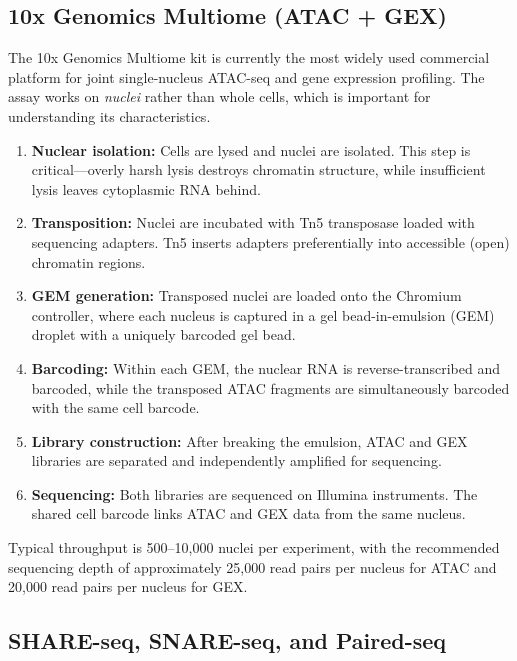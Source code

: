 \subsection{10x Genomics Multiome (ATAC + GEX)}
\label{subsec:multiomics:10x-multiome}

The 10x Genomics Multiome kit is currently the most widely used commercial platform for joint single-nucleus ATAC-seq and gene expression profiling. The assay works on \textit{nuclei} rather than whole cells, which is important for understanding its characteristics.

\begin{protocolbox}[title={10x Multiome ATAC + GEX Protocol Overview}]
\begin{enumerate}[itemsep=2pt]
  \item \textbf{Nuclear isolation:} Cells are lysed and nuclei are isolated. This step is critical---overly harsh lysis destroys chromatin structure, while insufficient lysis leaves cytoplasmic RNA behind.
  \item \textbf{Transposition:} Nuclei are incubated with Tn5 transposase loaded with sequencing adapters. Tn5 inserts adapters preferentially into accessible (open) chromatin regions.
  \item \textbf{GEM generation:} Transposed nuclei are loaded onto the Chromium controller, where each nucleus is captured in a gel bead-in-emulsion (GEM) droplet with a uniquely barcoded gel bead.
  \item \textbf{Barcoding:} Within each GEM, the nuclear RNA is reverse-transcribed and barcoded, while the transposed ATAC fragments are simultaneously barcoded with the same cell barcode.
  \item \textbf{Library construction:} After breaking the emulsion, ATAC and GEX libraries are separated and independently amplified for sequencing.
  \item \textbf{Sequencing:} Both libraries are sequenced on Illumina instruments. The shared cell barcode links ATAC and GEX data from the same nucleus.
\end{enumerate}
\end{protocolbox}

Typical throughput is 500--10,000 nuclei per experiment, with the recommended sequencing depth of approximately 25,000 read pairs per nucleus for ATAC and 20,000 read pairs per nucleus for GEX.

\subsection{SHARE-seq, SNARE-seq, and Paired-seq}
\label{subsec:multiomics:share-snare-paired}

